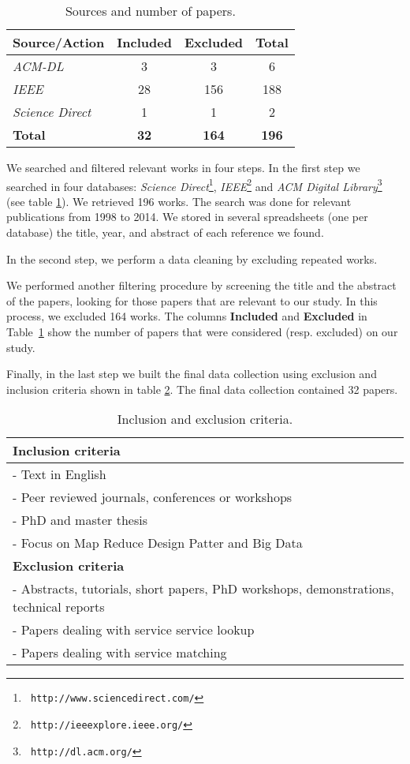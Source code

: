 \begin{table}\centering
\begin{tabular}{|l|c|c|c|} \hline
\textbf{Source/Action}	& \textbf{Included}	& \textbf{Excluded}	& \textbf{Total}	\\ \hline
\textit{ACM-DL}				& 3								& 3								& 6						\\ \hline
\textit{IEEE}						& 28								& 156								& 188					\\ \hline
\textit{Science Direct}	& 1								& 1							& 2					\\ \hline
\textbf{Total}					& \textbf{32}			& \textbf{164}			& \textbf{196}	\\ \hline
\end{tabular}
\caption{\label{table:Sources}Sources and number of papers.}
\end{table}

We searched and filtered relevant works in four steps. 
In the first  step we
searched in four databases: \textit{Science Direct}\footnote{\tt
http://www.sciencedirect.com/}, \textit{IEEE}\footnote{\tt
http://ieeexplore.ieee.org/} and \textit{ACM Digital Library}\footnote{\tt
http://dl.acm.org/} (see table \ref{table:Sources}).
We retrieved 196 works. 
The search was done for relevant publications from 1998 to 2014. 
We stored in several spreadsheets (one per database) the title, year,  and abstract of each reference we found. 

In the second step, we perform a data cleaning by excluding repeated works.  

We performed another filtering procedure by screening the title and the abstract
of the papers, looking for those papers that are relevant to our study.
In this process, we excluded 164 works. 
The columns \textbf{Included} and \textbf{Excluded} in Table~\ref{table:Sources}
show the number of papers that were considered (resp. excluded) on our study.

Finally, in the last step we built the final data collection using exclusion
and inclusion criteria shown in table \ref{table:criteria}. The final data
collection contained 32 papers.

 
\begin{table}\centering \small
\begin{tabular}{|l|} \hline
\textbf{Inclusion criteria}		\\ \hline\hline
- Text in English								\\ \hline
- Peer reviewed journals, conferences or workshops	\\ \hline
- PhD and master thesis	\\ \hline
- Focus on Map Reduce Design Patter and Big Data				\\ \hline\hline
\textbf{Exclusion criteria}		\\ \hline\hline	
- Abstracts, tutorials, short papers, PhD workshops, demonstrations, technical reports		\\ \hline	
- Papers dealing with service service lookup		\\ \hline
- Papers dealing with service matching 	\\ \hline
\end{tabular}
\caption{\label{table:criteria} Inclusion and exclusion criteria.}
\end{table}
